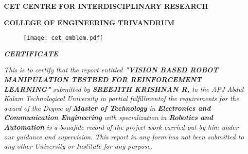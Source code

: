 \newpage


\thispagestyle{empty}

\begin{center}  {\bfseries CET CENTRE FOR INTERDISCIPLINARY RESEARCH}\end{center}
\begin{center}  {\bfseries COLLEGE OF ENGINEERING TRIVANDRUM}\end{center}

\begin{figure}[hbt]
	\centering
	\centerline{\texttt{[image: cet\_emblem.pdf]}}
\end{figure}
\begin{center}  {\Large \textit  {\textbf{CERTIFICATE}}}\vspace{.1cm}\end{center}

{\it \indent \indent This is to certify that the report entitled \emph{{\bf{"VISION BASED ROBOT MANIPULATION TESTBED FOR REINFORCEMENT LEARNING"}}} submitted by {\bf{ SREEJITH KRISHNAN R,}} to the APJ Abdul Kalam Technological University in partial fulfillmentof the requirements for the award of the Degree  of {\bf{Master  of  Technology}} in {\bf{Electronics and Communication Engineering}} with specialization in {\bf{Robotics and Automation}} is a bonafide record of the project work carried out by him under our guidance  and  supervision. This report in any form has not been submitted to any other University or Institute for any purpose.
}
\vspace{1cm}

